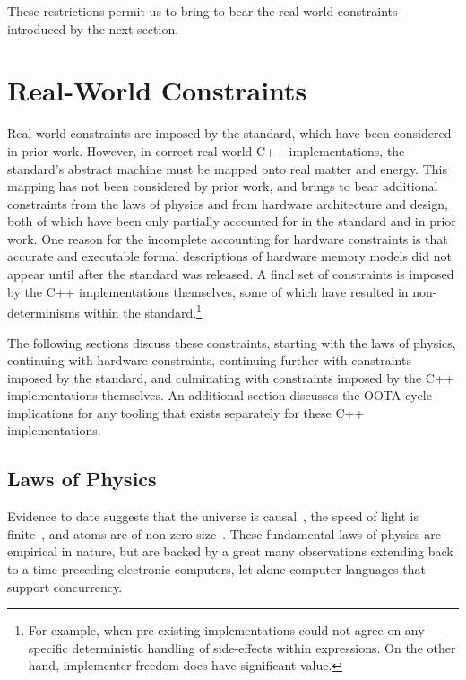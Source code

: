 \documentclass[10]{article}
\begin{document}

These restrictions permit us to bring to bear the real-world
constraints introduced by the next section.

\section{Real-World Constraints}
\label{sec:Real-World Constraints}

Real-world constraints are imposed by the standard, which have been
considered in prior work.
However, in correct real-world C++ implementations, the standard's
abstract machine must be mapped onto real matter and energy.
This mapping has not been considered by prior work, and brings to
bear additional constraints from the laws of physics and from hardware
architecture and design, both of which have been only partially accounted
for in the standard and in prior work.
One reason for the incomplete accounting for hardware constraints is
that accurate and executable formal descriptions of hardware memory
models did not appear until after the standard was released.
A final set of constraints is imposed by the C++ implementations
themselves, some of which have resulted in non-determinisms within
the standard.\footnote{
	For example, when pre-existing implementations could not agree
	on any specific deterministic handling of side-effects within
	expressions.
	On the other hand, implementer freedom does have significant
	value.}

The following sections discuss these constraints, starting with the
laws of physics, continuing with hardware constraints, continuing
further with constraints imposed by the standard, and culminating
with constraints imposed by the C++ implementations themselves.
An additional section discusses the OOTA-cycle implications for
any tooling that exists separately for these C++ implementations.

\subsection{Laws of Physics}
\label{sec:Laws of Physics}

Evidence to date suggests that the universe is
causal~\cite{Plato360BC-causality},
the speed of light is finite~\cite{OleRoemer1671SpeedOfLight}, and
atoms are of non-zero size~\cite{JeanBaptistePerrin1923AtomSize}.
These fundamental laws of physics are empirical in nature, but
are backed by a great many observations extending back to a time
preceding electronic computers, let alone computer languages that
support concurrency.
\end{document}
